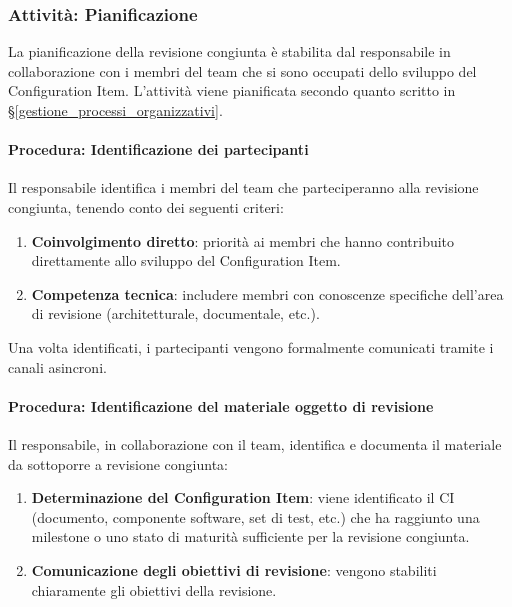 \documentclass[a4paper,12pt]{article}
\begin{document}
\subsubsection{Attività: Pianificazione}
La pianificazione della revisione congiunta è stabilita dal responsabile in
collaborazione con i membri del team che si sono occupati dello sviluppo del
Configuration Item. L'attività viene pianificata secondo quanto scritto in
§\ref{gestione_processi_organizzativi}.

\paragraph{Procedura: Identificazione dei partecipanti}
Il responsabile identifica i membri del team che parteciperanno alla revisione
congiunta, tenendo conto dei seguenti criteri:
\begin{enumerate}
    \item \textbf{Coinvolgimento diretto}: priorità ai membri che hanno contribuito direttamente allo sviluppo del Configuration Item.
    \item \textbf{Competenza tecnica}: includere membri con conoscenze specifiche dell'area di revisione (architetturale, documentale, etc.).
\end{enumerate}
Una volta identificati, i partecipanti vengono formalmente comunicati tramite i canali asincroni.

\paragraph{Procedura: Identificazione del materiale oggetto di revisione}
Il responsabile, in collaborazione con il team, identifica e documenta il
materiale da sottoporre a revisione congiunta:
\begin{enumerate}
    \item \textbf{Determinazione del Configuration Item}: viene identificato il CI (documento, componente software, set di test, etc.) che ha raggiunto una milestone o uno stato di maturità sufficiente per la revisione congiunta.
    \item \textbf{Comunicazione degli obiettivi di revisione}: vengono stabiliti chiaramente gli obiettivi della revisione.
\end{enumerate}
\end{document}
